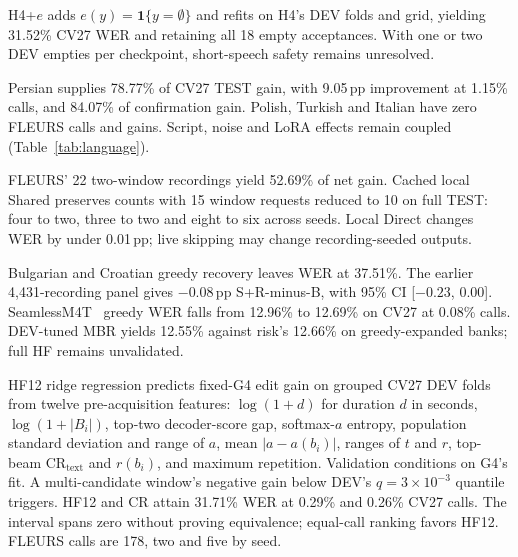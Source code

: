 \pagebreak[4]
H4+$e$ adds $e(y)=\mathbf1\{y=\emptyset\}$ and refits on H4's DEV folds and grid, yielding 31.52\% CV27 WER and retaining all 18 empty acceptances. With one or two DEV empties per checkpoint, short-speech safety remains unresolved.

Persian supplies 78.77\% of CV27 TEST gain, with 9.05\,pp improvement at 1.15\% calls, and 84.07\% of confirmation gain. Polish, Turkish and Italian have zero FLEURS calls and gains. Script, noise and LoRA effects remain coupled (Table~\ref{tab:language}).

FLEURS' 22 two-window recordings yield 52.69\% of net gain. Cached local Shared preserves counts with 15 window requests reduced to 10 on full TEST: four to two, three to two and eight to six across seeds. Local Direct changes WER by under 0.01\,pp; live skipping may change recording-seeded outputs.

Bulgarian and Croatian greedy recovery leaves WER at 37.51\%. The earlier 4,431-recording panel gives $-0.08$\,pp S+R-minus-B, with 95\% CI [$-0.23$, $0.00$]. SeamlessM4T~\cite{seamless2023,seamlessv1nature} greedy WER falls from 12.96\% to 12.69\% on CV27 at 0.08\% calls. DEV-tuned MBR yields 12.55\% against risk's 12.66\% on greedy-expanded banks; full HF remains unvalidated.

HF12 ridge regression predicts fixed-G4 edit gain on grouped CV27 DEV folds from twelve pre-acquisition features: $\log(1+d)$ for duration $d$ in seconds, $\log(1+|B_i|)$, top-two decoder-score gap, softmax-$a$ entropy, population standard deviation and range of $a$, mean $|a-a(b_i)|$, ranges of $t$ and $r$, top-beam $\mathrm{CR}_{\mathrm{text}}$ and $r(b_i)$, and maximum repetition. Validation conditions on G4's fit. A multi-candidate window's negative gain below DEV's $q=3\times10^{-3}$ quantile triggers. HF12 and CR attain 31.71\% WER at 0.29\% and 0.26\% CV27 calls. The interval spans zero without proving equivalence; equal-call ranking favors HF12. FLEURS calls are 178, two and five by seed.
